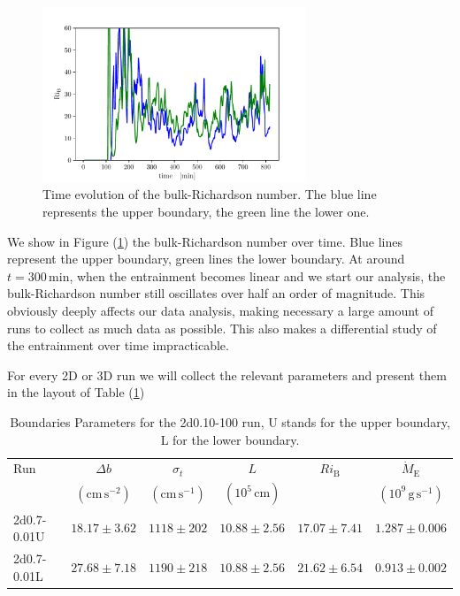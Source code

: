 \begin{figure}[t!]
\centering
\includegraphics[width=0.7\textwidth]{./img/bulk.pdf}
\caption{Time evolution of the bulk-Richardson number. The blue line represents the upper boundary, the green line the lower one.}
\label{fig:bulk}
\centering
\end{figure}
We show in Figure (\ref{fig:bulk}) the bulk-Richardson number over time. Blue lines represent the upper boundary, green lines the lower boundary. At around $t=\mathrm{300 \, min}$, when the entrainment becomes linear and we start our analysis, the bulk-Richardson number still oscillates over half an order of magnitude. This obviously deeply affects our data analysis, making necessary a large amount of runs to collect as much data as possible. This also makes a differential study of the entrainment over time impracticable. 

For every 2D or 3D run we will collect the relevant parameters and present them in the layout of Table (\ref{2dsingletab})
 \begin{table}\caption{Boundaries Parameters for the 2d0.10-100 run, U stands for the upper boundary, L for the lower boundary.}
 \begin{tabular}{lccccc}
	 \toprule
	 Run &$\Delta b  $&$\sigma_t$ & $L$&$Ri_{\mathrm{B}}$&$\dot{M}_{\mathrm{E}}$ \\
		    & $(\mathrm{cm \, s^{-2}})$&$(\mathrm{cm \, s^{-1}})$&$(10^5 \, \mathrm{cm})$ & & $(10^9 \, \mathrm{g \, s^{-1}})$ \\
	  	\midrule
		2d0.7-0.01U&$ 18.17 \pm 3.62 $&$1118 \pm 202 $ &  $10.88 \pm 2.56 $ & $17.07 \pm 7.41 $ & $1.287 \pm 0.006$\\
		2d0.7-0.01L &$27.68 \pm 7.18$&$1190 \pm 218$ & $10.88 \pm 2.56$ &  $21.62 \pm 6.54$ & $0.913 \pm 0.002$\\
		\bottomrule
	\end{tabular}\label{2dsingletab}
 \end{table}

